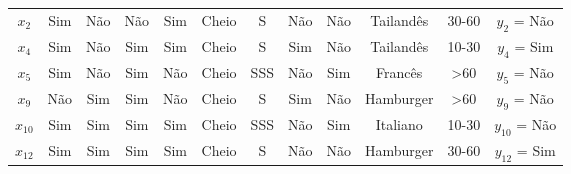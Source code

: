 \begin{center}
\begin{adjustbox}{max width=\textwidth}
\begin{tabular}{|cccccccccccc|}
        \multicolumn{1}{|c|}{${x_2}$}                     & \multicolumn{1}{|c|}{Sim}          & \multicolumn{1}{|c|}{Não} & \multicolumn{1}{|c|}{Não}         & \multicolumn{1}{|c|}{Sim}  & \multicolumn{1}{|c|}{Cheio}    & \multicolumn{1}{|c|}{S}     & \multicolumn{1}{|c|}{Não}   & \multicolumn{1}{|c|}{Não}     & \multicolumn{1}{|c|}{Tailandês}  & \multicolumn{1}{|c|}{30-60}       & \multicolumn{1}{|c|}{$y_2$ = Não}                     \\ 
        \multicolumn{1}{|c|}{${x_4}$}                     & \multicolumn{1}{|c|}{Sim}          & \multicolumn{1}{|c|}{Não} & \multicolumn{1}{|c|}{Sim}         & \multicolumn{1}{|c|}{Sim}  & \multicolumn{1}{|c|}{Cheio}    & \multicolumn{1}{|c|}{S}     & \multicolumn{1}{|c|}{Sim}   & \multicolumn{1}{|c|}{Não}     & \multicolumn{1}{|c|}{Tailandês}  & \multicolumn{1}{|c|}{10-30}       & \multicolumn{1}{|c|}{$y_4$ = Sim}                     \\ 
        \multicolumn{1}{|c|}{${x_5}$}                     & \multicolumn{1}{|c|}{Sim}          & \multicolumn{1}{|c|}{Não} & \multicolumn{1}{|c|}{Sim}         & \multicolumn{1}{|c|}{Não}  & \multicolumn{1}{|c|}{Cheio}    & \multicolumn{1}{|c|}{SSS}   & \multicolumn{1}{|c|}{Não}   & \multicolumn{1}{|c|}{Sim}     & \multicolumn{1}{|c|}{Francês}    & \multicolumn{1}{|c|}{>60}         & \multicolumn{1}{|c|}{$y_5$ = Não}                     \\ 
        \multicolumn{1}{|c|}{${x_9}$}                     & \multicolumn{1}{|c|}{Não}          & \multicolumn{1}{|c|}{Sim} & \multicolumn{1}{|c|}{Sim}         & \multicolumn{1}{|c|}{Não}  & \multicolumn{1}{|c|}{Cheio}    & \multicolumn{1}{|c|}{S}     & \multicolumn{1}{|c|}{Sim}   & \multicolumn{1}{|c|}{Não}     & \multicolumn{1}{|c|}{Hamburger}  & \multicolumn{1}{|c|}{>60}         & \multicolumn{1}{|c|}{$y_9$ = Não}                     \\ 
        \multicolumn{1}{|c|}{${x_{10}}$}                    & \multicolumn{1}{|c|}{Sim}          & \multicolumn{1}{|c|}{Sim} & \multicolumn{1}{|c|}{Sim}         & \multicolumn{1}{|c|}{Sim}  & \multicolumn{1}{|c|}{Cheio}    & \multicolumn{1}{|c|}{SSS}   & \multicolumn{1}{|c|}{Não}   & \multicolumn{1}{|c|}{Sim}     & \multicolumn{1}{|c|}{Italiano}   & \multicolumn{1}{|c|}{10-30}       & \multicolumn{1}{|c|}{$y_{10}$ = Não}                  \\ 
        \multicolumn{1}{|c|}{$x_{12}$}                    & \multicolumn{1}{|c|}{Sim}          & \multicolumn{1}{|c|}{Sim} & \multicolumn{1}{|c|}{Sim}         & \multicolumn{1}{|c|}{Sim}  & \multicolumn{1}{|c|}{Cheio}    & \multicolumn{1}{|c|}{S}     & \multicolumn{1}{|c|}{Não}   & \multicolumn{1}{|c|}{Não}     & \multicolumn{1}{|c|}{Hamburger}  & \multicolumn{1}{|c|}{30-60}       & \multicolumn{1}{|c|}{$y_{12}$ = Sim}                  \\ \hline
    \end{tabular}
    \end{adjustbox}
\end{center}
    
